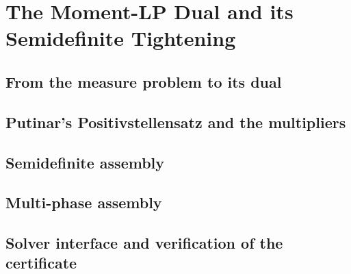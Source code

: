 
\section{The Moment-LP Dual and its Semidefinite Tightening}
\label{apx:sos}

\subsection{From the measure problem to its dual}
\label{sub:apx_duality}

\subsection{Putinar's Positivstellensatz and the multipliers}
\label{sub:apx_putinar}

\subsection{Semidefinite assembly}
\label{sub:apx_sdp_assembly}

\subsection{Multi-phase assembly}
\label{sub:apx_multiphase_assembly}

\subsection{Solver interface and verification of the certificate}
\label{sub:apx_solver}

